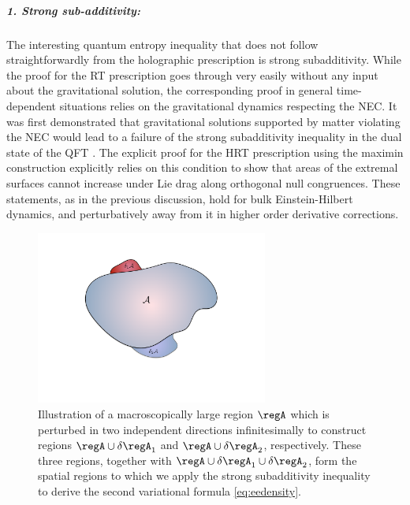 \documentclass[12pt,openany]{book}
\begin{document}
\subparagraph{1. Strong sub-additivity:} The interesting quantum entropy inequality that does not follow straightforwardly from the holographic prescription is strong subadditivity. While the proof for the RT prescription goes through very easily without any input about the gravitational solution, the corresponding proof in general time-dependent situations relies on the gravitational dynamics respecting the NEC. It was first demonstrated that gravitational solutions supported by matter violating the NEC would lead to a failure of the strong subadditivity inequality in the dual state of the QFT \cite{Callan:2012ip}. The explicit proof  for the HRT prescription using the maximin construction \cite{Wall:2012uf} explicitly relies on this condition to show that areas of the extremal surfaces cannot increase under Lie drag along  orthogonal null congruences. These statements, as in the previous discussion, hold for bulk Einstein-Hilbert dynamics, and perturbatively away from it in higher order derivative corrections.

\begin{figure}[htbp]
\begin{center}
\includegraphics[width=3in]{figures/infssa}
 \caption{Illustration of a macroscopically large region $\regA$ which is perturbed in two independent directions infinitesimally to construct regions $\regA \cup \delta\regA_1$ and $\regA \cup \delta \regA_2$, respectively. These three regions, together with $\regA\cup \delta\regA_1 \cup\delta \regA_2$, form the spatial regions to which we apply the strong subadditivity inequality to derive the second variational formula \eqref{eq:eedensity}.}
\label{f:infssa}
\end{center}
\end{figure}
%
\end{document}

